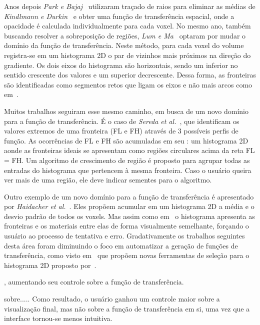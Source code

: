 	Anos depois \textit{Park e Bajaj}~\cite{park} utilizaram traçado de raios para eliminar as médias de \textit{Kindlmann e Durkin}~\cite{gordon} e obter uma função de transferência espacial, onde a opacidade é calculada individualmente para cada voxel. No mesmo ano, também buscando resolver a sobreposição de regiões, \textit{Lum e Ma}~\cite{lumema} optaram por mudar o domínio da função de transferência. Neste método, para cada voxel do volume registra-se em um histograma 2D o par de vizinhos mais próximos na direção do gradiente. Os dois eixos do histograma são horizontais, sendo um inferior no sentido crescente dos valores e um superior decrescente. Dessa forma, as fronteiras são identificadas como segmentos retos que ligam os eixos e não mais arcos como em~\cite{gordon}.
	
	Muitos trabalhos seguiram esse mesmo caminho, em busca de um novo domínio para a função de transferência. É o caso de \textit{Sereda et al.}~\cite{sereda1}, que identificam os valores extremos de uma fronteira (FL e FH) através de 3 possíveis perfis de função. As ocorrências de FL e FH são acumuladas em seu : um histograma 2D aonde as fronteiras ideais se apresentam como regiões circulares acima da reta FL = FH. Um algoritmo de crescimento de região é proposto para agrupar todas as entradas do histograma que pertencem à mesma fronteira. Caso o usuário queira ver mais de uma região, ele deve indicar sementes para o algoritmo.
	
	Outro exemplo de um novo domínio para a função de transferência é apresentado por \textit{Haidacher et al.}~\cite{haidacher}. Eles propõem acumular em um histograma 2D a média e o desvio padrão de todos os voxels. Mas assim como em~\cite{sereda1} o histograma apresenta as fronteiras e os materiais entre elas de forma visualmente semelhante, forçando o usuário ao processo de tentativa e erro. Gradativamente os trabalhos seguintes desta área foram diminuindo o foco em automatizar a geração de funções de transferência, como visto em~\cite{zou, wang} que propõem novas ferramentas de seleção para o histograma 2D proposto por~\cite{gordon}.
	
	
	
	
	
	, aumentando seu controle sobre a função de transferência.

	 sobre..... Como resultado, o usuário ganhou um controle maior sobre a visualização final, mas não sobre a função de transferência em si, uma vez que a interface tornou-se menos intuitiva. 

